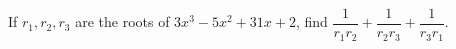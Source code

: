 If $r_1,r_2,r_3$ are the roots of $3x^3-5x^2+31x+2$, find $\dfrac{1}{r_1r_2}+\dfrac{1}{r_2r_3}+\dfrac{1}{r_3r_1}$.
